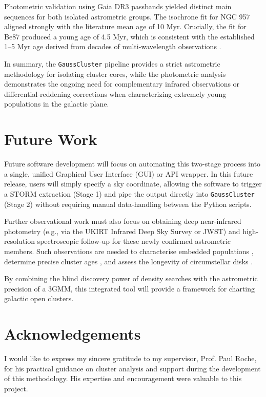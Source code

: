 \documentclass{CU_IOPStyle_PXT999}
\begin{document}
Photometric validation using Gaia DR3 passbands yielded distinct main sequences for both isolated astrometric groups. The isochrone fit for NGC 957 aligned strongly with the literature mean age of 10 Myr. Crucially, the fit for Be87 produced a young age of 4.5 Myr, which is consistent with the established 1--5 Myr age derived from decades of multi-wavelength observations \cite{turner_berkeley_1982, cantat-gaudin_painting_2020}. 

In summary, the \texttt{GaussCluster} pipeline provides a strict astrometric methodology for isolating cluster cores, while the photometric analysis demonstrates the ongoing need for complementary infrared observations or differential-reddening corrections when characterizing extremely young populations in the galactic plane.

\section{Future Work}
\label{ssec:6}
Future software development will focus on automating this two-stage process into a single, unified Graphical User Interface (GUI) or API wrapper. In this future release, users will simply specify a sky coordinate, allowing the software to trigger a STORM extraction (Stage 1) and pipe the output directly into \texttt{GaussCluster} (Stage 2) without requiring manual data-handling between the Python scripts. 

Further observational work must also focus on obtaining deep near-infrared photometry (e.g., via the UKIRT Infrared Deep Sky Survey or JWST) and high-resolution spectroscopic follow-up for these newly confirmed astrometric members. Such observations are needed to characterise embedded populations \cite{perren_analysis_2022}, determine precise cluster ages \cite{angelo_exploring_2025}, and assess the longevity of circumstellar disks \cite{alvarez-baena_longevity_2024}. 

By combining the blind discovery power of density searches with the astrometric precision of a 3GMM, this integrated tool will provide a framework for charting galactic open clusters.

\section*{Acknowledgements}
I would like to express my sincere gratitude to my supervisor, Prof. Paul Roche, for his practical guidance on cluster analysis and support during the development of this methodology. His expertise and encouragement were valuable to this project.
\end{document}
